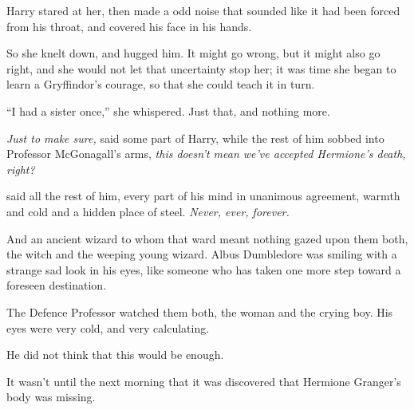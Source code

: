 Harry stared at her, then made a odd noise that sounded like it had been forced from his throat, and covered his face in his hands.

So she knelt down, and hugged him. It might go wrong, but it might also go right, and she would not let that uncertainty stop her; it was time she began to learn a Gryffindor’s courage, so that she could teach it in turn.

“I had a sister once,” she whispered. Just that, and nothing more.

\later

\emph{Just to make sure,} said some part of Harry, while the rest of him sobbed into Professor McGonagall’s arms, \emph{this doesn’t mean we’ve accepted Hermione’s death, right?}

\emph{} said all the rest of him, every part of his mind in unanimous agreement, warmth and cold and a hidden place of steel. \emph{Never, ever, forever.}

\later

And an ancient wizard to whom that ward meant nothing gazed upon them both, the witch and the weeping young wizard. Albus Dumbledore was smiling with a strange sad look in his eyes, like someone who has taken one more step toward a foreseen destination.

\later

The Defence Professor watched them both, the woman and the crying boy. His eyes were very cold, and very calculating.

He did not think that this would be enough.

\later

It wasn’t until the next morning that it was discovered that Hermione Granger’s body was missing.

